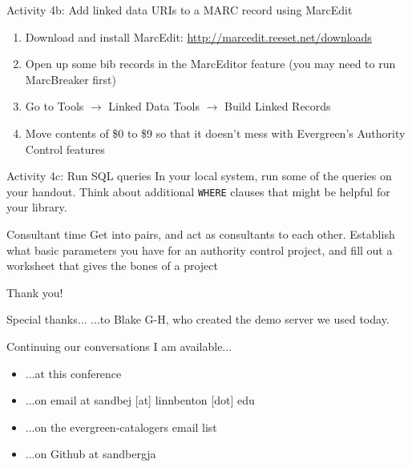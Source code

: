 \documentclass{beamer}
\begin{document}
\begin{frame}{Activity 4b: Add linked data URIs to a MARC record using MarcEdit}
 \begin{enumerate}
  \item Download and install MarcEdit: \url{http://marcedit.reeset.net/downloads}
  \item Open up some bib records in the MarcEditor feature (you may need to run MarcBreaker first)
  \item Go to Tools $\rightarrow$ Linked Data Tools $\rightarrow$ Build Linked Records
  \item Move contents of \$0 to \$9 so that it doesn't mess with Evergreen's Authority Control features
  
 \end{enumerate}

\end{frame}

\begin{frame}{Activity 4c: Run SQL queries}
In your local system, run some of the queries on your handout.  Think about additional \texttt{WHERE} clauses that might be helpful for your library.
\end{frame}



\begin{frame}{Consultant time}
Get into pairs, and act as consultants to each other.  Establish what basic parameters you have for an authority control project, and fill out a worksheet that gives the bones of a project

\end{frame}


\begin{frame}{Thank you!}

\begin{block}{Special thanks...}
...to Blake G-H, who created the demo server we used today.
\end{block}

\begin{block}{Continuing our conversations}
I am available...
\begin{itemize}
 \item ...at this conference
 \item ...on email at sandbej [at] linnbenton [dot] edu
 \item ...on the evergreen-catalogers email list
 \item ...on Github at sandbergja
\end{itemize}

\end{block}



\end{frame}
\end{document}
